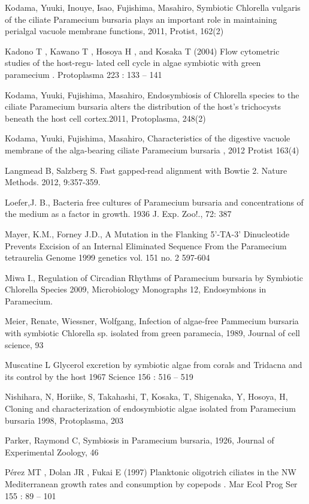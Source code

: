 
\noindent Kodama, Yuuki, Inouye, Isao,  Fujishima, Masahiro, Symbiotic Chlorella vulgaris of the ciliate Paramecium bursaria plays an important role in maintaining perialgal vacuole membrane functions, 2011, Protist, 162(2)

 
\noindent{} Kadono T , Kawano T , Hosoya H , and Kosaka T (2004) Flow cytometric studies of the host-regu- lated cell cycle in algae symbiotic with green paramecium . Protoplasma 223 : 133 – 141

 
\noindent{} Kodama, Yuuki, Fujishima, Masahiro, Endosymbiosis of Chlorella species to the ciliate Paramecium bursaria alters the distribution of the host's trichocysts beneath the host cell cortex.2011, Protoplasma, 248(2)

 
\noindent Kodama, Yuuki,  Fujishima, Masahiro, Characteristics of the digestive vacuole membrane of the alga-bearing ciliate Paramecium bursaria , 2012  Protist 163(4)

 
\noindent Langmead B, Salzberg S. Fast gapped-read alignment with Bowtie 2. Nature Methods. 2012, 9:357-359.

 
\noindent Loefer,J. B., Bacteria free cultures of Paramecium bursaria and concentrations of the medium as a factor in growth. 1936 J. Exp. Zoo!., 72: 387

 
\noindent Mayer, K.M., Forney J.D., A Mutation in the Flanking 5'-TA-3' Dinucleotide Prevents Excision of an Internal Eliminated Sequence From the Paramecium tetraurelia Genome 1999 genetics vol. 151 no. 2 597-604

 
\noindent Miwa I., Regulation of Circadian Rhythms of Paramecium bursaria by Symbiotic Chlorella Species 2009, Microbiology Monographs 12, Endosymbions in Paramecium.

 
\noindent Meier, Renate, Wiessner, Wolfgang, Infection of algae-free Pammecium bursaria with symbiotic Chlorella sp. isolated from green paramecia, 1989, Journal of cell science, 93

 
\noindent{} Muscatine L Glycerol excretion by symbiotic algae from corals and Tridacna and its control by the host 1967  Science 156 : 516 – 519

 
\noindent Nishihara, N, Horiike, S,  Takahashi, T, Kosaka, T, Shigenaka, Y, Hosoya, H, Cloning and characterization of endosymbiotic algae isolated from Paramecium bursaria 1998, Protoplasma, 203

 
\noindent Parker, Raymond C, Symbiosis in Paramecium bursaria, 1926, Journal of Experimental Zoology,  46

 
\noindent Pérez MT , Dolan JR , Fukai E (1997) Planktonic oligotrich ciliates in the NW Mediterranean growth rates and consumption by copepods . Mar Ecol Prog Ser 155 : 89 – 101

